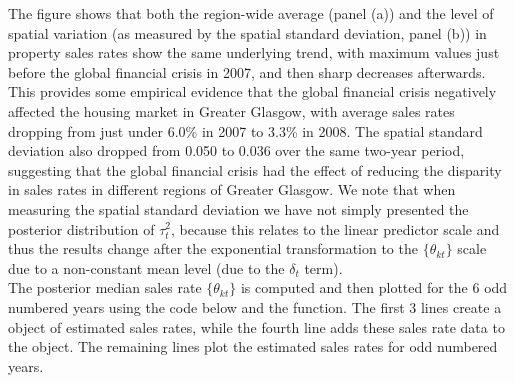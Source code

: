 \documentclass[article, nojss]{jss}
\begin{document}
The figure shows that both the region-wide average (panel (a)) and the level of spatial variation (as measured by the spatial standard deviation, panel (b)) in property sales rates show the same underlying trend, with maximum values just before the global financial crisis in 2007, and then sharp decreases afterwards. This provides some empirical evidence that the global financial crisis negatively affected the housing market in Greater Glasgow, with average sales rates dropping from just under 6.0\% in 2007 to 3.3\% in 2008. The spatial standard deviation also dropped from 0.050 to 0.036 over the same two-year period, suggesting that the global financial crisis had the effect of reducing the disparity in sales rates in different regions of Greater Glasgow. We note that when measuring the spatial standard deviation we have not simply presented the posterior distribution of $\tau^{2}_{t}$, because this relates to the linear predictor scale and thus the results change after the exponential transformation to the $\{\theta_{kt}\}$ scale due to a non-constant mean level (due to the $\delta_t$ term).\\

The posterior median sales rate $\{\theta_{kt}\}$ is computed and then plotted for the 6 odd numbered years using the code below and the  function. The first 3 lines create a  object of estimated sales rates, while the fourth line adds these sales rate data to the  object. The remaining lines plot the estimated sales rates for odd numbered years.

\end{document}
